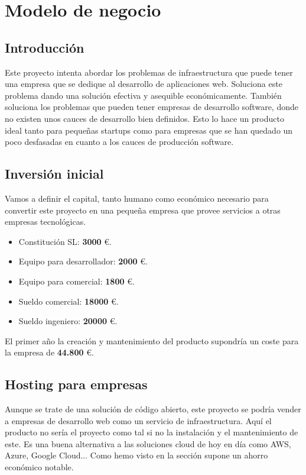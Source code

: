 \chapter {Modelo de negocio}

\section{Introducción}
        \begin{text}
                Este proyecto intenta abordar los problemas de infraestructura que puede tener una empresa que se dedique al desarrollo de aplicaciones web. Soluciona este problema dando una solución efectiva y asequible económicamente. También soluciona los problemas que pueden tener empresas de desarrollo software, donde no existen unos cauces de desarrollo bien definidos. Esto lo hace un producto ideal tanto para pequeñas startups como para empresas que se han quedado un poco desfasadas en cuanto a los cauces de producción software.
        \end{text}

\section{Inversión inicial}
        \begin{text}
                Vamos a definir el capital, tanto humano como económico necesario para convertir este proyecto en una pequeña empresa que provee servicios a otras empresas tecnológicas.

                \begin{itemize}
                        \item Constitución SL: \textbf{3000} \euro.
                        \item Equipo para desarrollador: \textbf{2000} \euro.
                        \item Equipo para comercial: \textbf{1800} \euro.
                        \item Sueldo comercial: \textbf{18000} \euro.
                        \item Sueldo ingeniero: \textbf{20000} \euro.
                \end{itemize}

                El primer año la creación y mantenimiento del producto supondría un coste para la empresa de \textbf{44.800} \euro.
        \end{text}

\section{Hosting para empresas}
        \begin{text}
        		Aunque se trate de una solución de código abierto, este proyecto se podría vender a empresas de desarrollo web como un servicio de infraestructura. Aquí el producto no sería el proyecto como tal si no la instalación y el mantenimiento de este. Es una buena alternativa a las soluciones cloud de hoy en día como AWS, Azure, Google Cloud... Como hemo visto en la sección  supone un ahorro económico notable.
        \end{text}

